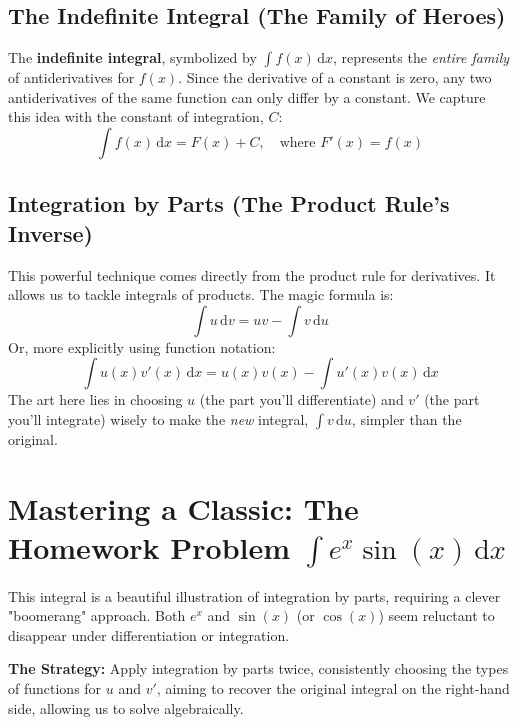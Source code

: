 \documentclass[11pt]{article}
\newcommand{\dx}{\,\mathrm{d}x} %
\newcommand{\du}{\,\mathrm{d}u} %
\newcommand{\dv}{\,\mathrm{d}v} %
\begin{document}
\subsection{The Indefinite Integral (The Family of Heroes)}
The \textbf{indefinite integral}, symbolized by $\int f(x) \dx$, represents the \textit{entire family} of antiderivatives for $f(x)$. Since the derivative of a constant is zero, any two antiderivatives of the same function can only differ by a constant. We capture this idea with the constant of integration, $C$:
\[ \int f(x) \dx = F(x) + C, \quad \text{where } F'(x) = f(x) \]

\subsection{Integration by Parts (The Product Rule's Inverse)}
This powerful technique comes directly from the product rule for derivatives. It allows us to tackle integrals of products. The magic formula is:
\[ \int u \dv = uv - \int v \du \]
Or, more explicitly using function notation:
\[ \int u(x)v'(x) \dx = u(x)v(x) - \int u'(x)v(x) \dx \]
The art here lies in choosing $u$ (the part you'll differentiate) and $v'$ (the part you'll integrate) wisely to make the \textit{new} integral, $\int v \du$, simpler than the original.

\section{Mastering a Classic: The Homework Problem $\int e^x \sin(x) \dx$}

This integral is a beautiful illustration of integration by parts, requiring a clever "boomerang" approach. Both $e^x$ and $\sin(x)$ (or $\cos(x)$) seem reluctant to disappear under differentiation or integration.

\textbf{The Strategy:} Apply integration by parts twice, consistently choosing the types of functions for $u$ and $v'$, aiming to recover the original integral on the right-hand side, allowing us to solve algebraically.
\end{document}
